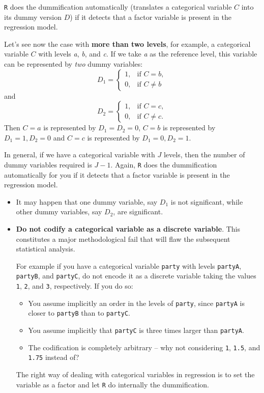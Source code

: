 \documentclass[]{book}
\providecommand{\tightlist}{%
  \setlength{\itemsep}{0pt}\setlength{\parskip}{0pt}}
\newenvironment{rmdblock}[1]
  {\begin{shaded*}
  \begin{itemize}
  \renewcommand{\labelitemi}{
    \raisebox{-.7\height}[0pt][0pt]{
      {\setkeys{Gin}{width=2em,keepaspectratio}\texttt{[image: img/icons/\#1]}}
    }
  }
  \item
  }
  {
  \end{itemize}
  \end{shaded*}
  }
\newenvironment{rmdcaution}
  {\begin{rmdblock}{caution}}
  {\end{rmdblock}}
\newenvironment{rmdinsight}
  {\begin{rmdblock}{insight}}
  {\end{rmdblock}}
\theoremstyle{definition}
\theoremstyle{definition}
\theoremstyle{definition}
\theoremstyle{remark}
\begin{document}
\texttt{R} does the dummification automatically (translates a
categorical variable \(C\) into its dummy version \(D\)) if it detects
that a factor variable is present in the regression model.

Let's see now the case with \textbf{more than two levels}, for example,
a categorical variable \(C\) with levels \emph{a}, \emph{b}, and
\emph{c}. If we take \emph{a} as the reference level, this variable can
be represented by \emph{two} dummy variables: \[
D_1=\left\{\begin{array}{ll}1,&\text{if }C=b,\\0,& \text{if }C\neq b\end{array}\right.
\] and \[
D_2=\left\{\begin{array}{ll}1,&\text{if }C=c,\\0,& \text{if }C\neq c.\end{array}\right.
\] Then \(C=a\) is represented by \(D_1=D_2=0\), \(C=b\) is represented
by \(D_1=1,D_2=0\) and \(C=c\) is represented by \(D_1=0,D_2=1\).

In general, if we have a categorical variable with \(J\) levels, then
the number of dummy variables required is \(J-1\). Again, \texttt{R}
does the dummification automatically for you if it detects that a factor
variable is present in the regression model.

\begin{rmdinsight}
It may happen that one dummy variable, say \(D_1\) is not significant,
while other dummy variables, say \(D_2\), are significant.
\end{rmdinsight}

\begin{rmdcaution}
\textbf{Do not codify a categorical variable as a discrete variable}.
This constitutes a major methodological fail that will flaw the
subsequent statistical analysis.

For example if you have a categorical variable \texttt{party} with
levels \texttt{partyA}, \texttt{partyB}, and \texttt{partyC}, do not
encode it as a discrete variable taking the values \texttt{1},
\texttt{2}, and \texttt{3}, respectively. If you do so:

\begin{itemize}
\tightlist
\item
  You assume implicitly an order in the levels of \texttt{party}, since
  \texttt{partyA} is closer to \texttt{partyB} than to \texttt{partyC}.
\item
  You assume implicitly that \texttt{partyC} is three times larger than
  \texttt{partyA}.
\item
  The codification is completely arbitrary -- why not considering
  \texttt{1}, \texttt{1.5}, and \texttt{1.75} instead of?
\end{itemize}

The right way of dealing with categorical variables in regression is to
set the variable as a factor and let \texttt{R} do internally the
dummification.
\end{rmdcaution}
\end{document}

